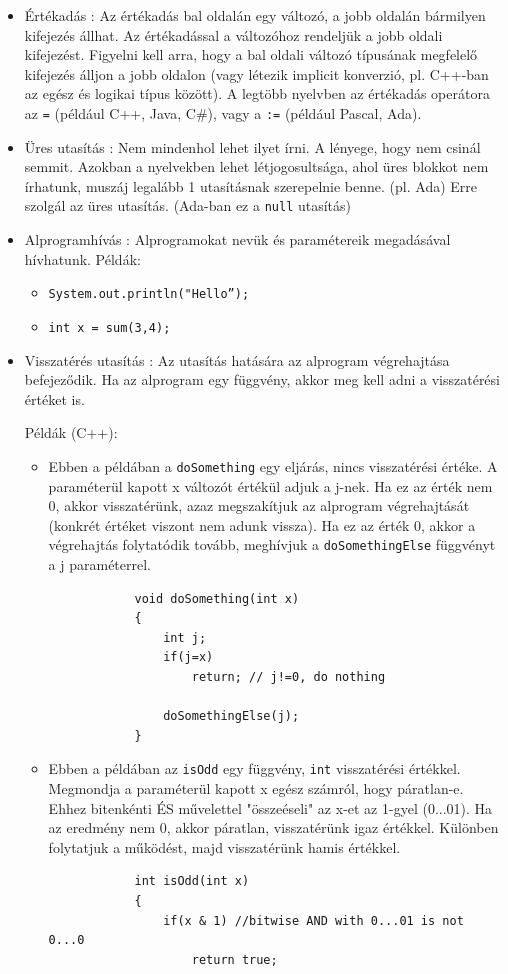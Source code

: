 \documentclass[12pt,margin=0px]{article}
\begin{document}
	\begin{itemize}
		\item	Értékadás : Az értékadás bal oldalán egy változó, a jobb oldalán bármilyen kifejezés állhat. Az
		értékadással a változóhoz rendeljük a jobb oldali kifejezést. Figyelni kell arra, hogy a bal oldali
		változó típusának megfelelő kifejezés álljon a jobb oldalon (vagy létezik implicit konverzió, pl. C++-ban
		az egész és logikai típus között). A legtöbb nyelvben az értékadás operátora az \texttt{=} (például C++, Java, C\#),
		vagy a \texttt{:=} (például Pascal, Ada).
	
		\item	Üres utasítás : Nem mindenhol lehet ilyet írni. A lényege, hogy nem csinál semmit.
		Azokban a nyelvekben lehet létjogosultsága,	ahol üres blokkot nem írhatunk,
		muszáj legalább 1 utasításnak szerepelnie benne. (pl. Ada) Erre szolgál az üres utasítás.
		(Ada-ban ez a \texttt{null} utasítás)
		
		\item	Alprogramhívás : Alprogramokat nevük és paramétereik megadásával hívhatunk.
		Példák:
		\begin{itemize}
			\item	\texttt{System.out.println("Hello”);}
			\item	\texttt{int x = sum(3,4);}
		\end{itemize}
		\item	Visszatérés utasítás : Az utasítás hatására az alprogram végrehajtása befejeződik. Ha az alprogram egy
		függvény, akkor meg kell adni a visszatérési értéket is.
		
		\noindent Példák (C++):
		\begin{itemize}
			\item	Ebben a példában a \texttt{doSomething} egy eljárás, nincs visszatérési értéke. A paraméterül kapott
			x változót értékül adjuk a j-nek. Ha ez az érték nem 0, akkor visszatérünk, azaz megszakítjuk az alprogram
			végrehajtását (konkrét értéket viszont nem adunk vissza). Ha ez az érték 0, akkor a végrehajtás folytatódik tovább,
			meghívjuk a \texttt{doSomethingElse} függvényt a j paraméterrel.
{\small
			\begin{verbatim}
			void doSomething(int x)
			{
			    int j;
			    if(j=x)
			        return; // j!=0, do nothing
			
			    doSomethingElse(j);
			}
			\end{verbatim}
}			
			\item Ebben a példában az \texttt{isOdd} egy függvény, \texttt{int} visszatérési értékkel. Megmondja a paraméterül kapott
			x egész számról, hogy páratlan-e. Ehhez bitenkénti ÉS művelettel "összeéseli" az x-et az 1-gyel (0...01). Ha az eredmény
			nem 0, akkor páratlan, visszatérünk igaz értékkel. Különben folytatjuk a működést, majd visszatérünk hamis értékkel.
{\small
			\begin{verbatim}
			int isOdd(int x)
			{
			    if(x & 1) //bitwise AND with 0...01 is not 0...0
			        return true;
			

\end{verbatim}}
\end{itemize}
\end{itemize}
\end{document}
